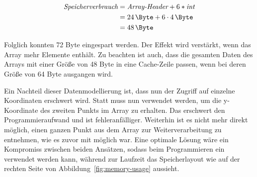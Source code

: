 \begin{equation}
    \begin{split}
        \textit{Speicherverbrauch} & = \textit{Array-Header} + 6 * \textit{int} \\
        & = \SI{24}{\Byte} + 6 \cdot \SI{4}{\Byte} \\
        & = \SI{48}{\Byte}\label{eq:memory-usage-flat}
    \end{split}
\end{equation}

Folglich konnten 72 Byte eingespart werden.
Der Effekt wird verstärkt, wenn das Array mehr Elemente enthält.
Zu beachten ist auch, dass die gesamten Daten des Arrays mit einer Größe von 48 Byte in eine Cache-Zeile passen, wenn bei deren Größe von 64 Byte ausgangen wird.

Ein Nachteil dieser Datenmodellierung ist, dass nun der Zugriff auf einzelne Koordinaten erschwert wird.
Statt  muss nun  verwendet werden, um die y-Koordinate des zweiten Punkts im Array zu erhalten.
Das erschwert den Programmieraufwand und ist fehleranfälliger.
Weiterhin ist es nicht mehr direkt möglich, einen ganzen Punkt aus dem Array zur Weiterverarbeitung zu entnehmen, wie es zuvor mit  möglich war.
Eine optimale Lösung wäre ein Kompromiss zwischen beiden Ansätzen, sodass beim Programmieren ein  verwendet werden kann, während zur Laufzeit das Speicherlayout wie auf der rechten Seite von Abbildung~\ref{fig:memory-usage} aussieht.

